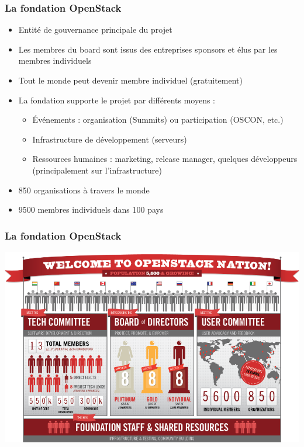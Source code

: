   \begin{frame}
    \frametitle{La fondation OpenStack}
    \begin{itemize}
      \item Entité de gouvernance principale du projet
      \item Les membres du board sont issus des entreprises sponsors et élus par les membres individuels
      \item Tout le monde peut devenir membre individuel (gratuitement)
      \item La fondation supporte le projet par différents moyens :
      \begin{itemize}
        \item Événements : organisation (Summits) ou participation (OSCON, etc.)
        \item Infrastructure de développement (serveurs)
        \item Ressources humaines : marketing, release manager, quelques développeurs (principalement sur l'infrastructure)
      \end{itemize}
      \item 850 organisations à travers le monde
      \item 9500 membres individuels dans 100 pays
    \end{itemize}
  \end{frame}

  \begin{frame}
    \frametitle{La fondation OpenStack}
      \includegraphics[width=\textwidth]{images/foundation.png}
  \end{frame}

